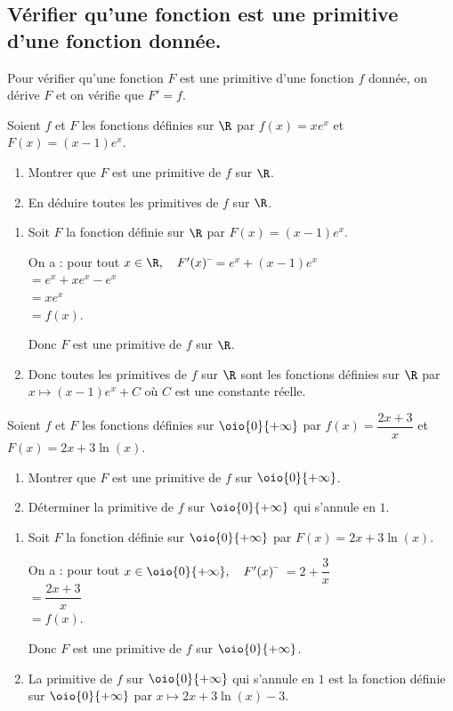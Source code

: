 \documentclass[a4paper,11pt,exos]{nsi} %
\begin{document}
\subsection*{Vérifier qu'une fonction est une primitive d'une fonction donnée.}

\begin{methode}
Pour vérifier qu'une fonction $F$ est une primitive d'une fonction $f$ donnée, on dérive $F$ et on vérifie que $F'=f$.
\end{methode}

\exo{}
Soient $f$ et $F$ les fonctions définies sur $\R$ par $f(x)= xe^x$ et $F(x)= (x-1)e^x$.
\begin{enumerate}
    \item Montrer que $F$ est une primitive de $f$ sur $\R$.
    \item En déduire toutes les primitives de $f$ sur $\R$.
\end{enumerate}

\textcolor{UGLiBlue}{
    \begin{enumerate}
        \item Soit $F$ la fonction définie sur $\R$ par $F(x)=(x-1)e^x$.
        \begin{tabbing}
            On a : pour tout $x\in\R, \quad F'(x)$  \=$=e^x+(x-1)e^x$\\
            \> $=e^x+xe^x-e^x$\\
            \> $=xe^x$\\
            \> $=f(x)$.
        \end{tabbing}
        Donc $F$ est une primitive de $f$ sur $\R$.
        \item Donc toutes les primitives de $f$ sur $\R$ sont les fonctions définies sur $\R$ par $x\mapsto (x-1)e^x+C$ où $C$ est une constante réelle.
    \end{enumerate}
}

\exo{}
Soient $f$ et $F$ les fonctions définies sur $\oio{0}{+\infty}$ par $f(x)= \dfrac{2x+3}{x}$ et $F(x)=2x+3\ln(x)$.
\begin{enumerate}
    \item Montrer que $F$ est une primitive de $f$ sur $\oio{0}{+\infty}$.
    \item Déterminer la primitive de $f$ sur $\oio{0}{+\infty}$ qui s'annule en $1$.
\end{enumerate}

\textcolor{UGLiBlue}{
    \begin{enumerate}
        \item Soit $F$ la fonction définie sur $\oio{0}{+\infty}$ par $F(x)=2x+3\ln(x)$.
        \begin{tabbing}
            On a : pour tout $x\in\oio{0}{+\infty}, \quad F'(x)$ \= $=2+\dfrac{3}{x}$\\
            \> $=\dfrac{2x+3}{x}$\\
            \> $=f(x)$.
        \end{tabbing}
        Donc $F$ est une primitive de $f$ sur $\oio{0}{+\infty}$.
        \item La primitive de $f$ sur $\oio{0}{+\infty}$ qui s'annule en $1$ est la fonction définie sur $\oio{0}{+\infty}$ par $x\mapsto 2x+3\ln(x)-3$.
    \end{enumerate}
}
\end{document}
